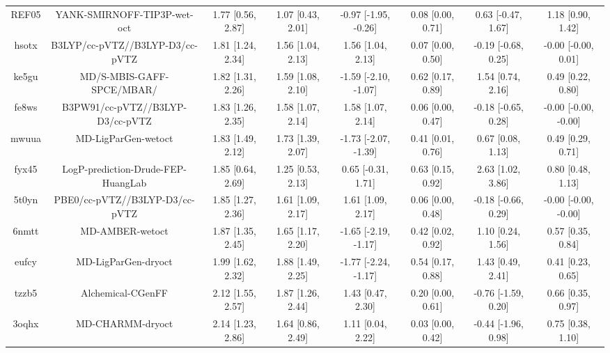 \documentclass{article}
\begin{document}
\begin{center}
\begin{longtable}{|cccccccc|}
 REF05 &                        YANK-SMIRNOFF-TIP3P-wet-oct &  1.77 [0.56, 2.87] &  1.07 [0.43, 2.01] &  -0.97 [-1.95, -0.26] &  0.08 [0.00, 0.71] &   0.63 [-0.47, 1.67] &     1.18 [0.90, 1.42] \\
 hsotx &                    B3LYP/cc-pVTZ//B3LYP-D3/cc-pVTZ &  1.81 [1.24, 2.34] &  1.56 [1.04, 2.13] &     1.56 [1.04, 2.13] &  0.07 [0.00, 0.50] &  -0.19 [-0.68, 0.25] &   -0.00 [-0.00, 0.01] \\
 ke5gu &                          MD/S-MBIS-GAFF-SPCE/MBAR/ &  1.82 [1.31, 2.26] &  1.59 [1.08, 2.10] &  -1.59 [-2.10, -1.07] &  0.62 [0.17, 0.89] &    1.54 [0.74, 2.16] &     0.49 [0.22, 0.80] \\
 fe8ws &                   B3PW91/cc-pVTZ//B3LYP-D3/cc-pVTZ &  1.83 [1.26, 2.35] &  1.58 [1.07, 2.14] &     1.58 [1.07, 2.14] &  0.06 [0.00, 0.47] &  -0.18 [-0.65, 0.28] &  -0.00 [-0.00, -0.00] \\
 mwuua &                                MD-LigParGen-wetoct &  1.83 [1.49, 2.12] &  1.73 [1.39, 2.07] &  -1.73 [-2.07, -1.39] &  0.41 [0.01, 0.76] &    0.67 [0.08, 1.13] &     0.49 [0.29, 0.71] \\
 fyx45 &                 LogP-prediction-Drude-FEP-HuangLab &  1.85 [0.64, 2.69] &  1.25 [0.53, 2.13] &    0.65 [-0.31, 1.71] &  0.63 [0.15, 0.92] &    2.63 [1.02, 3.86] &     0.80 [0.48, 1.13] \\
 5t0yn &                     PBE0/cc-pVTZ//B3LYP-D3/cc-pVTZ &  1.85 [1.27, 2.36] &  1.61 [1.09, 2.17] &     1.61 [1.09, 2.17] &  0.06 [0.00, 0.48] &  -0.18 [-0.66, 0.29] &  -0.00 [-0.00, -0.00] \\
 6nmtt &                                    MD-AMBER-wetoct &  1.87 [1.35, 2.45] &  1.65 [1.17, 2.20] &  -1.65 [-2.19, -1.17] &  0.42 [0.02, 0.92] &    1.10 [0.24, 1.56] &     0.57 [0.35, 0.84] \\
 eufcy &                                MD-LigParGen-dryoct &  1.99 [1.62, 2.32] &  1.88 [1.49, 2.25] &  -1.77 [-2.24, -1.17] &  0.54 [0.17, 0.88] &    1.43 [0.49, 2.41] &     0.41 [0.23, 0.65] \\
 tzzb5 &                                  Alchemical-CGenFF &  2.12 [1.55, 2.57] &  1.87 [1.26, 2.44] &     1.43 [0.47, 2.30] &  0.20 [0.00, 0.61] &  -0.76 [-1.59, 0.20] &     0.66 [0.35, 0.97] \\
 3oqhx &                                   MD-CHARMM-dryoct &  2.14 [1.23, 2.86] &  1.64 [0.86, 2.49] &     1.11 [0.04, 2.22] &  0.03 [0.00, 0.42] &  -0.44 [-1.96, 0.98] &     0.75 [0.38, 1.10] \\

\end{longtable}
\end{center}
\end{document}
